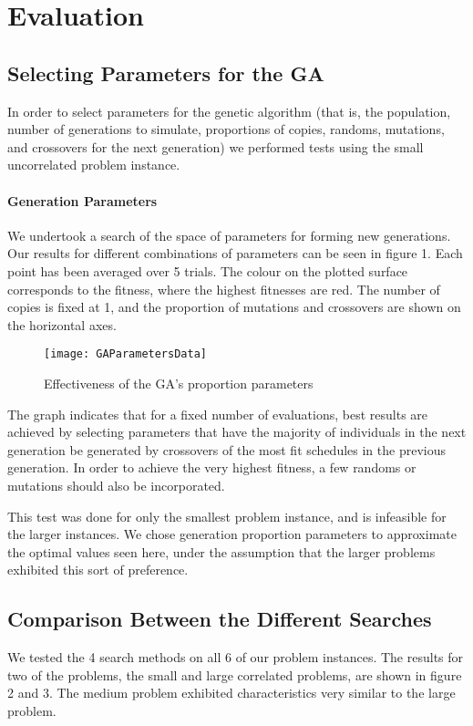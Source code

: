 \documentclass[letterpaper]{article}
\begin{document}
\section{Evaluation}
   \subsection{Selecting Parameters for the GA}
      In order to select parameters for the genetic algorithm (that is, the population, 
      number of generations to simulate, proportions of copies, randoms, mutations, and 
      crossovers for the next generation) we performed tests using the small uncorrelated 
      problem instance.
      
      \paragraph{Generation Parameters}
        We undertook a search of the space of parameters for forming new generations. 
        Our results for different combinations of parameters can be seen in figure 1. 
        Each point has been averaged over 5 trials. The colour on the plotted surface 
        corresponds to the fitness, where the highest fitnesses are red. The number of 
        copies is fixed at 1, and the proportion of mutations and crossovers are shown 
        on the horizontal axes.
        
        \begin{figure}[h]
  		  \centering
  		  \texttt{[image: GAParametersData]}
  	      \caption{Effectiveness of the GA's proportion parameters}
  	      \label{graph:GAParam1}
		\end{figure}	
		
        The graph indicates that for a fixed number of evaluations, best results are 
        achieved by selecting parameters that have the majority of individuals in the next 
        generation be generated by crossovers of the most fit schedules in the previous 
        generation. In order to achieve the very highest fitness, a few randoms or mutations 
        should also be incorporated.
        
        This test was done for only the smallest problem instance, and is infeasible for the 
        larger instances. We chose generation proportion parameters to approximate the optimal 
        values seen here, under the assumption that the larger problems exhibited this sort of 
        preference.
      
  \subsection{Comparison Between the Different Searches}
    We tested the 4 search methods on all 6 of our problem instances. The results 
    for two of the problems, the small and large correlated problems, are shown in figure 2 
    and 3. The medium problem exhibited characteristics very similar to the large problem.
    
\end{document}
